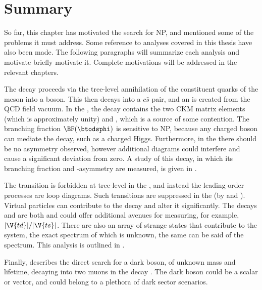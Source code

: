 \section{Summary}

So far, this chapter has motivated the search for NP, and mentioned some of the problems it must
address.
Some reference to analyses covered in this thesis have also been made.
The following paragraphs will summarize each analysis and motivate briefly motivate it.
Complete motivations will be addressed in the relevant chapters.

The decay \btodsphi proceeds via the tree-level annihilation of the constituent quarks of
the \Bp meson into a \Wp boson.
This then decays into a $c\bar s$ pair, and an \ssbar is created from the QCD field vacuum.
In the \sm, the decay contains the two CKM matrix elements  (which is approximately
unity) and
, which is a source of some contention.
The branching fraction $\BF(\btodsphi)$ is sensitive to NP, because any charged boson can
mediate
the decay, such as a charged Higgs.
Furthermore, in the \sm there should be no \CP asymmetry observed, however additional
diagrams could
interfere and cause a significant deviation from zero.
A study of this decay, in which its branching fraction and \CP-asymmetry are measured, is
given in
.

The \fcnc transition  is forbidden at tree-level in the \sm, and instead
the leading order processes are loop diagrams.
Such transitions are \ckm suppressed in the \sm (by  and ).
Virtual \bsm particles can contribute to the
decay and
alter it significantly.
The decays \btokpipimumu and \btophikmumu are both   and could offer
additional avenues for measuring, for example, $|\V{td}|/|\V{ts}|$.
There are also an array of strange states that contribute to the \kpipi system, the exact
spectrum of which is unknown, the same can be said of the \phik spectrum.
This analysis is outlined in .

Finally,  describes the direct search for a dark boson, of unknown mass and lifetime,
decaying into two muons in the decay \decay{\Bd}{\Kstarent\mumu}.
The dark boson could be a scalar or vector, and could belong to a plethora of dark sector
scenarios.








